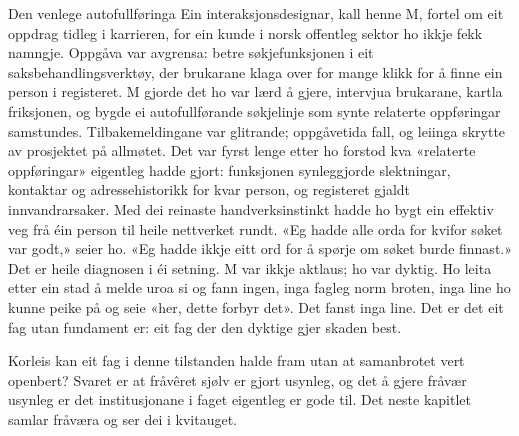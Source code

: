 \begin{kasus}{Den venlege autofullføringa}
Ein interaksjonsdesignar, kall henne M, fortel om eit oppdrag tidleg i karrieren, for ein kunde i norsk offentleg sektor ho ikkje fekk namngje. Oppgåva var avgrensa: betre søkjefunksjonen i eit saksbehandlingsverktøy, der brukarane klaga over for mange klikk for å finne ein person i registeret. M gjorde det ho var lærd å gjere, intervjua brukarane, kartla friksjonen, og bygde ei autofullførande søkjelinje som synte relaterte oppføringar samstundes. Tilbakemeldingane var glitrande; oppgåvetida fall, og leiinga skrytte av prosjektet på allmøtet. Det var fyrst lenge etter ho forstod kva «relaterte oppføringar» eigentleg hadde gjort: funksjonen synleggjorde slektningar, kontaktar og adressehistorikk for kvar person, og registeret gjaldt innvandrarsaker. Med dei reinaste handverksinstinkt hadde ho bygt ein effektiv veg frå éin person til heile nettverket rundt. «Eg hadde alle orda for kvifor søket var godt,» seier ho. «Eg hadde ikkje eitt ord for å spørje om søket burde finnast.» Det er heile diagnosen i éi setning. M var ikkje aktlaus; ho var dyktig. Ho leita etter ein stad å melde uroa si og fann ingen, inga fagleg norm broten, inga line ho kunne peike på og seie «her, dette forbyr det». Det fanst inga line. Det er det eit fag utan fundament er: eit fag der den dyktige gjer skaden best.
\end{kasus}

\vignett

Korleis kan eit fag i denne tilstanden halde fram utan at samanbrotet vert openbert? Svaret er at fråvêret sjølv er gjort usynleg, og det å gjere fråvær usynleg er det institusjonane i faget eigentleg er gode til. Det neste kapitlet samlar fråværa og ser dei i kvitauget.



